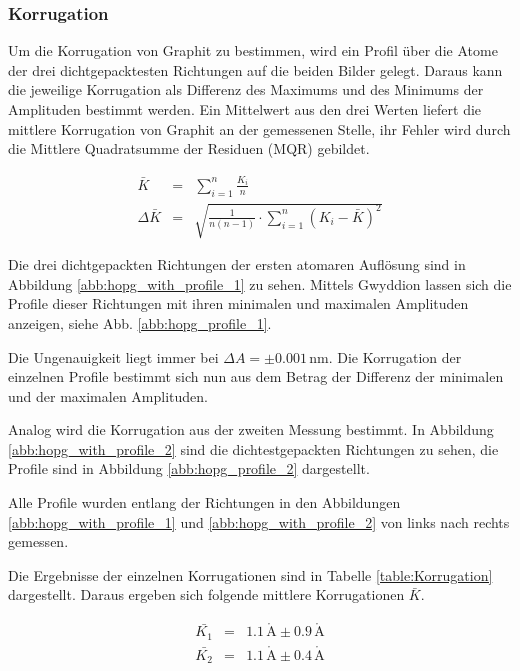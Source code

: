\documentclass[12pt,a4paper]{scrartcl}
\numberwithin{equation}{section} %
\begin{document}
\hypertarget{korrugation}{%
\subsubsection{Korrugation}\label{korrugation}}

Um die Korrugation von Graphit zu bestimmen, wird ein Profil über die Atome der drei dichtgepacktesten Richtungen auf die beiden Bilder gelegt. Daraus kann die jeweilige Korrugation als Differenz des Maximums und des Minimums der Amplituden bestimmt werden. Ein Mittelwert aus den drei Werten liefert die mittlere Korrugation von Graphit an der gemessenen Stelle, ihr Fehler wird durch die Mittlere Quadratsumme der Residuen (MQR) gebildet.

\begin{eqnarray}
	\bar{K} &=& \sum_{i=1}^n \frac{K_i}{n} \\
	\Delta \bar{K} &=& \sqrt{\frac{1}{n (n-1)} \cdot \sum_{i=1}^{n} (K_i -\bar{K})^2}
\end{eqnarray}

\noindent
Die drei dichtgepackten Richtungen der ersten atomaren Auflösung sind in Abbildung \ref{abb:hopg_with_profile_1} zu sehen. Mittels Gwyddion \cite{Gwyddion} lassen sich die Profile dieser Richtungen mit ihren minimalen und maximalen Amplituden anzeigen, siehe Abb. \ref{abb:hopg_profile_1}.

Die Ungenauigkeit liegt immer bei $\Delta A = \pm 0.001 \mathrm{\,nm}$. Die Korrugation der einzelnen Profile bestimmt sich nun aus dem Betrag der Differenz der minimalen und der maximalen Amplituden.

Analog wird die Korrugation aus der zweiten Messung bestimmt. In Abbildung \ref{abb:hopg_with_profile_2} sind die dichtestgepackten Richtungen zu sehen, die Profile sind in Abbildung \ref{abb:hopg_profile_2} dargestellt.

Alle Profile wurden entlang der Richtungen in den Abbildungen \ref{abb:hopg_with_profile_1} und \ref{abb:hopg_with_profile_2} von links nach rechts gemessen.

Die Ergebnisse der einzelnen Korrugationen sind in Tabelle \ref{table:Korrugation} dargestellt. Daraus ergeben sich folgende mittlere Korrugationen $\bar{K}$.

\begin{eqnarray}
	\bar{K_1} &=& 1.1 \mathrm{\,\mathring{A}} \pm 0.9 \mathrm{\,\mathring{A}} \\
	\bar{K_2} &=& 1.1 \mathrm{\,\mathring{A}} \pm 0.4 \mathrm{\,\mathring{A}}
\end{eqnarray}
\end{document}
